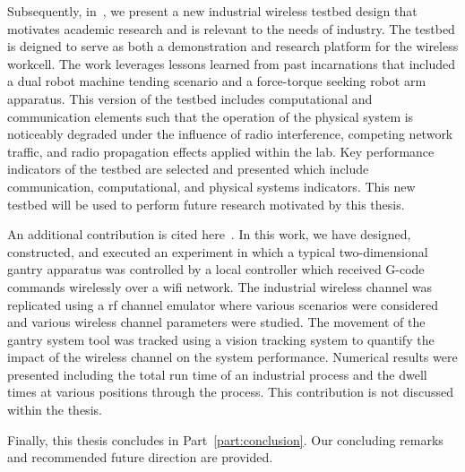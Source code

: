 Subsequently, in~\cite{Candell.PLMConf2020}, we present a new industrial wireless testbed design that motivates academic research and is relevant to the needs of industry. The testbed is deigned to serve as both a demonstration and research platform for the wireless workcell. The work leverages lessons learned from past incarnations that included a dual robot machine tending scenario and a force-torque seeking robot arm apparatus. This version of the testbed includes computational and communication elements such that the operation of the physical system is noticeably degraded under the influence of radio interference, competing network traffic, and radio propagation effects applied within the lab. Key performance indicators of the testbed are selected and presented which include communication, computational, and physical systems indicators. This new testbed will be used to perform future research motivated by this thesis.

An additional contribution is cited here~\cite{MSEC2019-2896}.  In this work, we have designed, constructed, and executed an experiment in which a typical two-dimensional gantry apparatus was controlled by a local controller which received G-code commands wirelessly over a \gls{wifi} network. The industrial wireless channel was replicated using a \gls{rf} channel emulator where various scenarios were considered and various wireless channel parameters were studied. The movement of the gantry system tool was tracked using a vision tracking system to quantify the impact of the wireless channel on the system performance. Numerical results were presented including the total run time of an industrial process and the dwell times at various positions through the process. This contribution is not discussed within the thesis.

Finally, this thesis concludes in Part~\ref{part:conclusion}.  Our concluding remarks and recommended future direction are provided.



